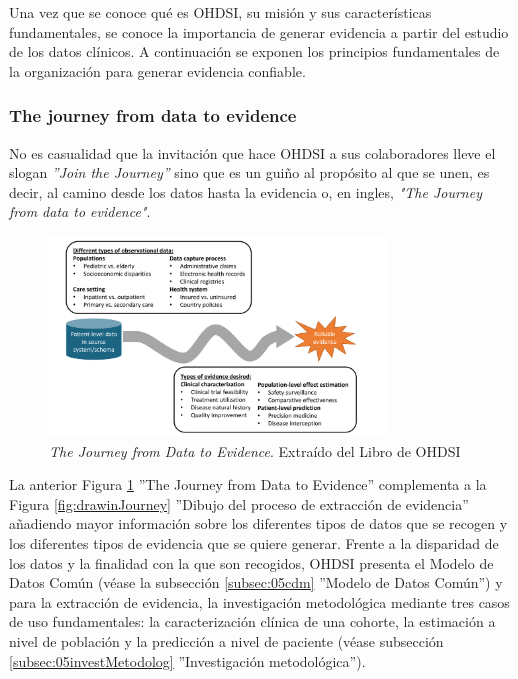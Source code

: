 Una vez que se conoce qué es OHDSI, su misión y sus características fundamentales, se conoce la importancia de generar evidencia a partir del estudio de los datos clínicos. A continuación se exponen los principios fundamentales de la organización para generar evidencia confiable.

\subsubsection{The journey from data to evidence}

No es casualidad que la invitación que hace OHDSI a sus colaboradores lleve el slogan \textit{''Join the Journey''} sino que es un guiño al propósito al que se unen, es decir, al camino desde los datos hasta la evidencia o, en ingles, \textit{"The Journey from data to evidence"}.

\begin{figure}[H]
    \centering
    \includegraphics[width=0.80\textwidth]{figures/journeyDataToEvidence.png}
     \caption{\textit{The Journey from Data to Evidence}. Extraído del Libro de OHDSI \cite{OHDSIbook}}
    \label{fig:journeyDataToEvidence}
\end{figure}

La anterior Figura \ref{fig:journeyDataToEvidence} ''The Journey from Data to Evidence'' complementa a la Figura \ref{fig:drawinJourney} ''Dibujo del proceso de extracción de evidencia'' añadiendo mayor información sobre los diferentes tipos de datos que se recogen y los diferentes tipos de evidencia que se quiere generar. Frente a la disparidad de los datos y la finalidad con la que son recogidos, OHDSI presenta el Modelo de Datos Común (véase la subsección \ref{subsec:05cdm} ''Modelo de Datos Común'') y para la extracción de evidencia, la investigación metodológica mediante tres casos de uso fundamentales: la caracterización clínica de una cohorte, la estimación a nivel de población y la predicción a nivel de paciente (véase subsección \ref{subsec:05investMetodolog} ''Investigación metodológica'').

